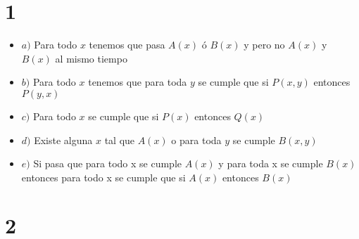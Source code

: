\documentclass[12pt, fleqn]{article}                            %
\theoremstyle{break}                                            %
\begin{document}
\restoregeometry                                                    %
\nopagecolor                                                        %




\tableofcontents{}
\label{sec:Index}

\clearpage


\clearpage
\section{1}

    \begin{itemize}

        \item  $a)$
            Para todo $x$ tenemos que pasa $A(x)$ ó $B(x)$ y pero no $A(x)$ y $B(x)$ al mismo tiempo

        \item  $b)$
            Para todo $x$ tenemos que para toda $y$ se cumple que si $P(x, y)$ entonces $P(y, x)$

        \item  $c)$
            Para todo $x$ se cumple que si $P(x)$ entonces $Q(x)$

        \item  $d)$
            Existe alguna $x$ tal que $A(x)$ o para toda $y$ se cumple $B(x, y)$

        \item  $e)$
            Si pasa que para todo x se cumple $A(x)$ y para toda x se cumple $B(x)$ entonces para todo x se cumple
            que si $A(x)$ entonces $B(x)$

    \end{itemize}




\section{2}
\end{document}
